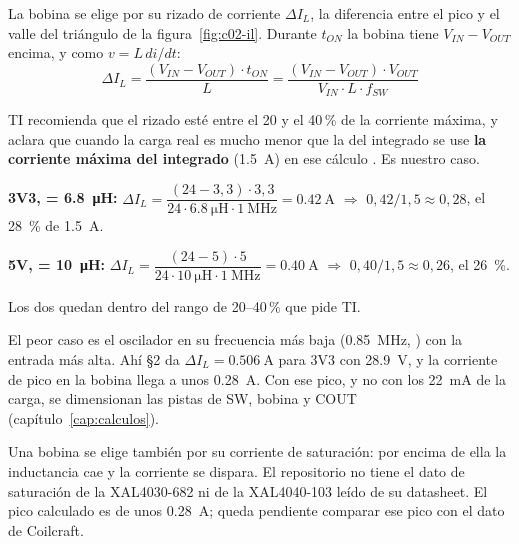 La bobina se elige por su rizado de corriente $\Delta I_L$, la diferencia entre el pico y el valle del triángulo de la figura~\ref{fig:c02-il}. Durante $t_{ON}$ la bobina tiene $V_{IN}-V_{OUT}$ encima, y como $v=L\,di/dt$:
\begin{equation}
\Delta I_L = \frac{(V_{IN}-V_{OUT})\cdot t_{ON}}{L} = \frac{(V_{IN}-V_{OUT})\cdot V_{OUT}}{V_{IN}\cdot L\cdot f_{SW}}
\label{eq:c02-rizado}
\end{equation}

TI recomienda que el rizado esté entre el 20 y el 40\,\% de la corriente máxima, y aclara que cuando la carga real es mucho menor que la del integrado se use \textbf{la corriente máxima del integrado} (\SI{1.5}{\ampere}) en ese cálculo . Es nuestro caso.

\begin{calculo}
\textbf{3V3,  = \SI{6.8}{\micro\henry}:}
$\Delta I_L = \dfrac{(24-3{,}3)\cdot 3{,}3}{24\cdot\SI{6.8}{\micro\henry}\cdot\SI{1}{\mega\hertz}} = \SI{0.42}{\ampere}$
$\Rightarrow$ $0{,}42/1{,}5\approx 0{,}28$, el \SI{28}{\percent} de \SI{1.5}{\ampere}.

\textbf{5V,  = \SI{10}{\micro\henry}:}
$\Delta I_L = \dfrac{(24-5)\cdot 5}{24\cdot\SI{10}{\micro\henry}\cdot\SI{1}{\mega\hertz}} = \SI{0.40}{\ampere}$
$\Rightarrow$ $0{,}40/1{,}5\approx 0{,}26$, el \SI{26}{\percent}.

Los dos quedan dentro del rango de 20--40\,\% que pide TI.
\end{calculo}

El peor caso es el oscilador en su frecuencia más baja (\SI{0.85}{\mega\hertz}, ) con la entrada más alta. Ahí  §2 da $\Delta I_L=\SI{0.506}{\ampere}$ para 3V3 con \SI{28.9}{\volt}, y la corriente de pico en la bobina llega a unos \SI{0.28}{\ampere}. Con ese pico, y no con los \SI{22}{\milli\ampere} de la carga, se dimensionan las pistas de SW, bobina y COUT (capítulo~\ref{cap:calculos}).

\begin{ojo}
Una bobina se elige también por su corriente de saturación: por encima de ella la inductancia cae y la corriente se dispara. El repositorio no tiene el dato de saturación de la XAL4030-682 ni de la XAL4040-103 leído de su datasheet. El pico calculado es de unos \SI{0.28}{\ampere}; queda pendiente comparar ese pico con el dato de Coilcraft.
\end{ojo}

